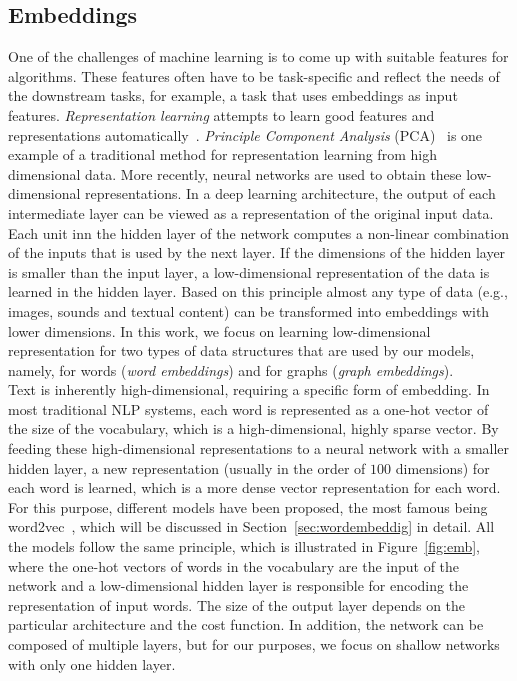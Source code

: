 \subsection{Embeddings}\label{subsec:embeddings}
One of the challenges of machine learning is to come up with suitable features for algorithms. These features often have to be task-specific and reflect the needs of the downstream tasks, for example, a task that uses embeddings as input features. \emph{Representation learning} attempts to learn good features and representations automatically~. \emph{Principle Component Analysis} (PCA)~ is one example of a traditional method for representation learning from high dimensional data. More recently, neural networks are used to obtain these low-dimensional representations. In a deep learning architecture, the output of each intermediate layer can be viewed as a representation of the original input data. Each unit inn the hidden layer of the network computes a non-linear combination of the inputs that is used by the next layer.  If the dimensions of the hidden layer is smaller than the input layer, a low-dimensional representation of the data is learned in the hidden layer. Based on this principle almost any type of data (e.g., images, sounds and textual content) can be transformed into embeddings with lower dimensions. In this work, we focus on learning low-dimensional representation for two types of data structures that are used by our models, namely, for words (\emph{word embeddings}) and for graphs (\emph{graph embeddings}). \\
Text is inherently high-dimensional, requiring a specific form of embedding.
In most traditional NLP systems, each word is represented as a one-hot vector of the size of the vocabulary, which is a high-dimensional, highly sparse vector. 
By feeding these high-dimensional representations to a neural network with a smaller hidden layer, a new representation (usually in the order of $100$ dimensions) for each word is learned, which is a more dense vector representation for each word. For this purpose, different models have been proposed, the most famous being word2vec~, which will be discussed in Section~\ref{sec:wordembeddig} in detail. All the models follow the same principle, which is illustrated in Figure~\ref{fig:emb}, where the one-hot vectors of words in the vocabulary are the input of the network and a low-dimensional hidden layer is responsible for encoding the representation of input words.  The size of the output layer depends on the particular architecture and the cost function. In addition, the network can be composed of multiple layers, but for our purposes, we focus on shallow networks with only one hidden layer. \\
